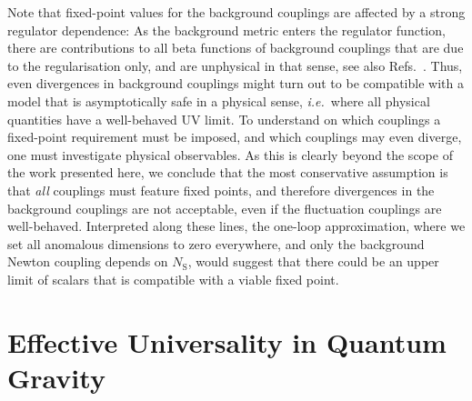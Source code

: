 \documentclass[11pt]{book}
\newcommand\NS{ N_{\scriptscriptstyle{\mathrm{S}}} }
\newcommand\ie{\textit{i.e.}\ }
\numberwithin{equation}{chapter}
\begin{document}
Note that fixed-point values for the background couplings are affected by a strong regulator dependence:
As the background metric enters the regulator function,
there are contributions to all beta functions of background couplings that are due to the regularisation only,
and are unphysical in that sense, see also
Refs.~\cite{Folkerts:2011jz, Litim:2002ce, Litim:2002hj, Bridle:2013sra}.
Thus, even divergences in background couplings might turn out to be compatible with a model that
is asymptotically safe in a physical sense, \ie where all physical quantities have a well-behaved UV limit.
To understand on which couplings a fixed-point requirement must be imposed,
and which couplings may even diverge, one must investigate physical observables.
As this is clearly beyond the scope of the work presented here, we conclude that the most conservative
assumption is that \emph{all} couplings must feature fixed points,
and therefore divergences in the background couplings are not acceptable,
even if the fluctuation couplings are well-behaved. Interpreted along these lines,
the one-loop approximation, where we set all anomalous dimensions to zero everywhere,
and only the background Newton coupling depends on $\NS$,
would suggest that there could be an upper limit of scalars that is compatible with a viable fixed point.




\chapter{Effective Universality in Quantum Gravity}
\label{ch:jan}
\end{document}
